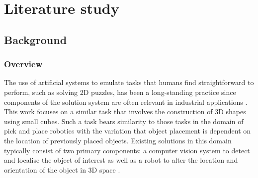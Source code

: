 
\section{Literature study}

%
%
%

\subsection{Background}


\subsubsection{Overview}

The use of artificial systems to emulate tasks that humans find straightforward to perform, such as solving 2D puzzles, has been a long-standing practice since components of the solution system are often relevant in industrial applications \cite{Burdea:Solving_Jigsaw_Puzzles_by_a_Robot}. This work focuses on a similar task that involves the construction of 3D shapes using small cubes. Such a task bears similarity to those tasks in the domain of pick and place robotics with the variation that object placement is dependent on the location of previously placed objects. Existing solutions in this domain typically consist of two primary components: a computer vision system to detect and localise the object of interest as well as a robot to alter the location and orientation of the object in 3D space \cite{Sharath:Gantry_Robot_Design}.


